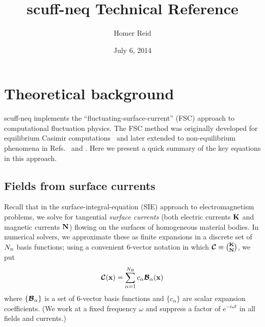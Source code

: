 \documentclass[letterpaper]{article}
\title {{\sc scuff-neq} Technical Reference}
\author {Homer Reid}
\date {July 6, 2014}
\begin{document}
\pagestyle{myheadings}
\maketitle

\tableofcontents

\newpage
\section{Theoretical background}

{\sc scuff-neq} implements the ``fluctuating-surface-current''
(FSC) approach to computational fluctuation physics. The 
FSC method was originally developed for equilibrium Casimir
computations~\cite{Reid2009, Reid2011, Reid2013B} and later
extended to non-equilibrium phenomena in 
Refs.~ and .
Here we present a quick summary of the key equations in this
approach.

\subsection*{Fields from surface currents}

Recall that in the surface-integral-equation (SIE) approach to
electromagnetism problems, we solve for tangential
\textit{surface currents} (both electric currents $\mathbf{K}$ 
and magnetic currents $\mathbf{N}$) flowing on the surfaces of 
homogeneous material bodies. In numerical solvers, we 
approximate these as finite expansions in a discrete set
of $N_{\hbox{\tiny{B}}}$ basis functions; using a convenient 6-vector notation 
in which $\boldsymbol{\mathcal{C}}\equiv {\mathbf{K} \choose \mathbf{N}}$, we put
$$ \boldsymbol{\mathcal{C}}(\mathbf{x})=\sum_{\alpha=1}^{N_{\hbox{\tiny{B}}}} 
   c_\alpha \boldsymbol{\mathcal{B}}_\alpha(\mathbf{x}) 
$$ 
where $\{\boldsymbol{\mathcal{B}}_\alpha\}$ is a set of 6-vector basis functions
and $\{c_\alpha\}$ are scalar expansion coefficients.
(We work at a fixed frequency $\omega$ and suppress a factor of
$e^{-i\omega t}$ in all fields and currents.)
\end{document}
